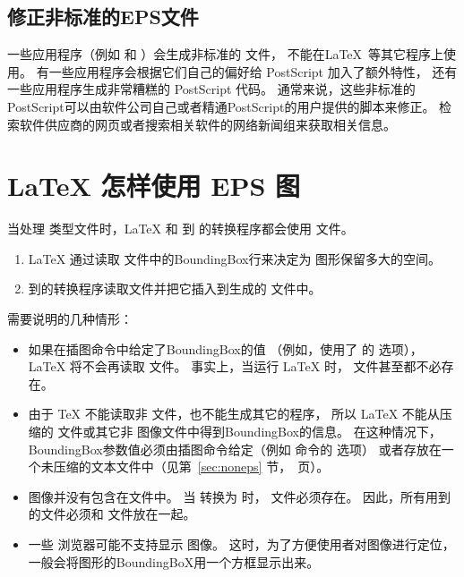 \subsection{修正非标准的EPS文件}\label{ssec:fixeps}
一些应用程序（例如  和  ）会生成非标准的  文件，
不能在\LaTeX\ 等其它程序上使用。
有一些应用程序会根据它们自己的偏好给 PostScript 加入了额外特性，
还有一些应用程序生成非常糟糕的 PostScript 代码。
通常来说，这些非标准的PostScript可以由软件公司自己或者精通PostScript的用户提供的脚本来修正。
检索软件供应商的网页或者搜索相关软件的网络新闻组来获取相关信息。

\section{\LaTeX{} 怎样使用 EPS 图}\label{sec:useeps}

当处理 类型文件时，\LaTeX{} 和  到  的转换程序都会使用  文件。
\begin{enumerate}
	\item \LaTeX{} 通过读取  文件中的BoundingBox行来决定为  图形保留多大的空间。
	\item {} 到的转换程序读取文件并把它插入到生成的 文件中。
\end{enumerate}

需要说明的几种情形：
\begin{itemize}
	\item 如果在插图命令中给定了BoundingBox的值
	（例如，使用了  的  选项），
	\LaTeX{} 将不会再读取  文件。
	事实上，当运行 \LaTeX{} 时， 文件甚至都不必存在。
	\item 由于 \TeX{} 不能读取非 \ascii 文件，也不能生成其它的程序，
	所以 \LaTeX{} 不能从压缩的  文件或其它非  图像文件中得到BoundingBox的信息。
	在这种情况下，BoundingBox参数值必须由插图命令给定（例如  命令的  选项）
	或者存放在一个未压缩的文本文件中（见第~\ref{sec:noneps} 节，\pageref{sec:noneps}~页）。
	\item {} 图像并没有包含在文件中。
	当  转换为  时， 文件必须存在。
	因此，所有用到的文件必须和  文件放在一起。
	\item 一些  浏览器可能不支持显示  图像。
	这时，为了方便使用者对图像进行定位，一般会将图形的BoundingBoX用一个方框显示出来。
\end{itemize}

